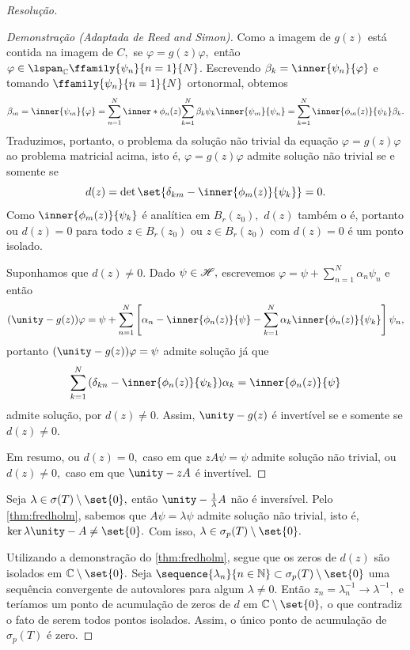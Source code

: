\begin{proof}[Resolução]
\begin{proof}[Demonstração (Adaptada de Reed and Simon)]
    Como a imagem de \(g(z)\) está contida na imagem de \(C,\) se \(\varphi = g(z)\varphi,\) então \(\varphi \in \lspan_\mathbb{C}{\ffamily{\psi_n}{n=1}{N}}\). Escrevendo \(\beta_k = \inner{\psi_n}{\varphi}\) e tomando \(\ffamily{\psi_n}{n=1}{N}\) ortonormal, obtemos
    \begin{equation*}
      \beta_m = \inner{\psi_m}{\varphi} = \sum_{n = 1}^N{\inner*{\phi_n(z)}{\sum_{k = 1}^N{\beta_k\psi_k}}\inner{\psi_m}{\psi_n}} = \sum_{k=1}^N{\inner{\phi_m(z)}{\psi_k} \beta_k}.
    \end{equation*}
    Traduzimos, portanto, o problema da solução não trivial da equação \(\varphi = g(z)\varphi\) ao problema matricial acima, isto é, \(\varphi = g(z) \varphi\) admite solução não trivial se e somente se
    \begin{equation*}
      d(z) = \det\set{\delta_{km} - \inner{\phi_m(z)}{\psi_k}} = 0.
    \end{equation*}
    Como \(\inner{\phi_m(z)}{\psi_k}\) é analítica em \(B_r(z_0),\) \(d(z)\) também o é, portanto ou \(d(z) = 0\) para todo \(z \in B_r(z_0)\) ou \(z \in B_r(z_0)\) com \(d(z) = 0\) é um ponto isolado.

    Suponhamos que \(d(z) \neq 0\). Dado \(\psi \in \mathscr{H},\) escrevemos \(\varphi = \psi + \sum_{n = 1}^N \alpha_n \psi_n\) e então
    \begin{equation*}
      (\unity - g(z))\varphi = \psi + \sum_{n = 1}^N{\left[\alpha_n - \inner{\phi_n(z)}{\psi} - \sum_{k = 1}^N{\alpha_k\inner{\phi_n(z)}{\psi_k}}\right]\psi_n},
    \end{equation*}
    portanto \((\unity - g(z))\varphi = \psi\) admite solução já que
    \begin{equation*}
      \sum_{k = 1}^{N}{(\delta_{kn} - \inner{\phi_n(z)}{\psi_k})\alpha_k} = \inner{\phi_n(z)}{\psi}
    \end{equation*}
    admite solução, por \(d(z) \neq 0.\) Assim, \(\unity - g(z)\) é invertível se e somente se \(d(z) \neq 0.\)

    Em resumo, ou \(d(z) = 0,\) caso em que \(zA\psi = \psi\) admite solução não trivial, ou \(d(z) \neq 0,\) caso em que \(\unity - zA\) é invertível.
  \end{proof}

  Seja \(\lambda \in \sigma(T) \setminus\set{0},\) então \(\unity - \frac{1}{\lambda}A\) não é inversível. Pelo \cref{thm:fredholm}, sabemos que \(A\psi = \lambda\psi\) admite solução não trivial, isto é, \(\ker{\lambda \unity - A} \neq \set{0}.\) Com isso, \(\lambda \in \sigma_p(T) \setminus \set{0}.\)

  Utilizando a demonstração do \cref{thm:fredholm}, segue que os zeros de \(d(z)\) são isolados em \(\mathbb{C} \setminus \set{0}.\) Seja \(\sequence{\lambda_n}{n\in\mathbb{N}} \subset \sigma_p(T) \setminus \set{0}\) uma sequência convergente de autovalores para algum \(\lambda \neq 0.\) Então \(z_n = \lambda^{-1}_n \to \lambda^{-1},\) e teríamos um ponto de acumulação de zeros de \(d\) em \(\mathbb{C} \setminus\set{0},\) o que contradiz o fato de serem todos pontos isolados. Assim, o único ponto de acumulação de \(\sigma_p(T)\) é zero.
\end{proof}
